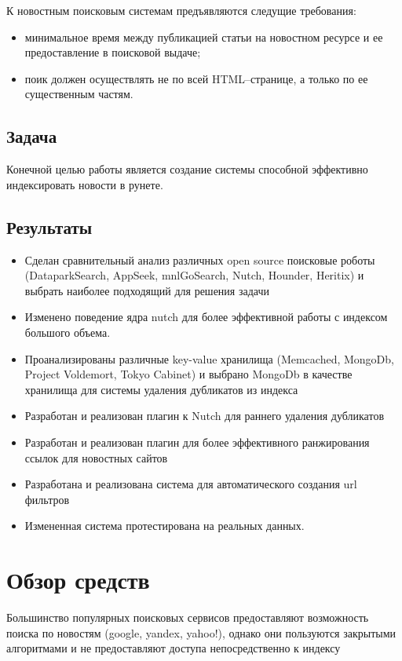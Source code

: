 К новостным поисковым системам предъявляются следущие требования:
\begin{itemize} 
\item минимальное время между публикацией статьи на новостном ресурсе и ее 
    предоставление в поисковой выдаче;
\item поик должен осуществлять не по всей HTML--странице, а только по ее 
    существенным частям. 
\end{itemize}

\section{Задача}
Конечной целью работы является создание системы способной эффективно индексировать новости в рунете.

\section{Результаты}
\begin{itemize}
 \item Сделан сравнительный анализ различных open source поисковые роботы (DataparkSearch,
AppSeek, mnlGoSearch, Nutch, Hounder, Heritix) и выбрать наиболее подходящий для
решения задачи
 \item Изменено поведение ядра nutch для более эффективной работы с индексом большого объема.
 \item Проанализированы различные key-value хранилища (Memcached, MongoDb, Project Voldemort, Tokyo Cabinet) и выбрано MongoDb в качестве хранилища для системы удаления дубликатов из индекса
 \item Разработан и реализован плагин к Nutch для раннего удаления дубликатов
 \item Разработан и реализован плагин для более эффективного ранжирования ссылок для новостных сайтов
 \item Разработана и реализована система для автоматического создания url фильтров
 \item Измененная система протестирована на реальных данных.
\end{itemize}

\chapter{Обзор средств}
Большинство популярных поисковых сервисов предоставляют возможность поиска по новостям (google, yandex, yahoo!), однако они пользуются закрытыми алгоритмами и не предоставляют доступа непосредственно к индексу
